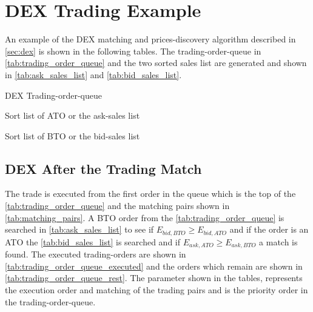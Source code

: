 \section{DEX Trading Example}\label{sec:dex_example}

An example of the DEX matching and prices-discovery algorithm described in \cref{sec:dex} is shown in the following tables. The trading-order-queue in \cref{tab:trading_order_queue} and the two sorted sales list are generated and shown in \cref{tab:ask_sales_list} and \cref{tab:bid_sales_list}.

\begin{table}[H]
\begin{center}

\end{center}
\caption{DEX Trading-order-queue} 
\label{tab:trading_order_queue}
\end{table}

\pagebreak
\begin{table}[H]
\begin{center}

\end{center}
\caption{Sort list of ATO or the ask-sales list} 
\label{tab:ask_sales_list}
\end{table}

\begin{table}[H]
\begin{center}

\end{center}
\caption{Sort list of BTO or the bid-sales list} 
\label{tab:bid_sales_list}
\end{table}

\pagebreak
\subsection{DEX After the Trading Match}
The trade is executed from the first order in the queue which is the top of the \cref{tab:trading_order_queue} and the matching pairs shown in \cref{tab:matching_pairs}. A BTO order from the \cref{tab:trading_order_queue} is searched in \cref{tab:ask_sales_list} to see if $E_{bid,BTO} \geq E_{bid,ATO}$ and if the order is an ATO the \cref{tab:bid_sales_list} is searched and if $E_{ask,ATO} \geq E_{ask,BTO}$ a match is found. 
The executed trading-orders are shown in \cref{tab:trading_order_queue_executed} and the orders which remain are shown in \cref{tab:trading_order_queue_rest}.
The parameter  shown in the tables, represents the execution order and matching  of the trading pairs and  is the priority order in the trading-order-queue.

